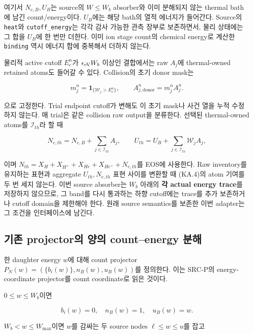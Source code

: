 \documentclass[11pt,a4paper]{article}
\begin{document}
여기서 \(N_{e,B},U_B\)는 source의 \(W\le W_b\) absorber와 이미 분해되지 않는 thermal bath에 남긴 count/energy이다. \(U_B\)에는 해당 bath의 열적 에너지가 들어간다. Source의 \texttt{heat}와 \texttt{cutoff\_energy}는 각각 감사 가능한 관측 장부로 보존하면서, 물리 상태에는 그 합을 \(U_B\)에 한 번만 더한다. 이미 ion stage count의 chemical energy로 계산한 \texttt{binding} 역시 에너지 합에 중복해서 더하지 않는다.

물리적 active cutoff \(E_c^n\)가 \(\epsilon_{\rm eV}W_b\) 이상인 결합에서는 raw \(A_j\)에 thermal-owned retained atoms도 들어갈 수 있다. Collision의 초기 donor mask는

\[
 m_j^n=\mathbf1_{\{\mathcal W_j>E_c^n\}},\qquad
 A_{j,\mathrm{donor}}^n=m_j^n A_j^n.
 \tag{KA.3}
\]

으로 고정한다. Trial endpoint cutoff가 변해도 이 초기 mask나 사건 열을 누적 수정하지 않는다. 매 trial은 같은 collision raw output을 분류한다. 선택된 thermal-owned atoms를 \(\mathcal I_{th}\)라 할 때

\[
 N_{e,th}=N_{e,B}+\sum_{j\in\mathcal I_{th}}A_j,\qquad
 U_{th}=U_B+\sum_{j\in\mathcal I_{th}}\mathcal W_jA_j,
 \tag{KA.4}
\]

이며 \(N_{th}=X_H+X_{H^+}+X_{He}+X_{He^+}+N_{e,th}\)를 EOS에 사용한다. Raw inventory를 유지하는 표현과 aggregate \(U_{th},N_{e,th}\) 표현 사이를 변환할 때 (KA.4)의 atom 기여를 두 번 세지 않는다. 이번 source absorber는 \(W_b\) 아래의 \textbf{각 actual energy trace}를 저장하지 않으므로, 그 band를 다시 통과하는 하향 cutoff에는 trace를 추가 보존하거나 cutoff domain을 제한해야 한다. 원래 source semantics를 보존한 이번 adapter는 그 조건을 인터페이스에 남긴다.

\hypertarget{uxae30uxc874-projectoruxc758-uxc591uxc758-countenergy-uxbd84uxd574}{%
\subsection{기존 projector의 양의 count--energy 분해}\label{uxae30uxc874-projectoruxc758-uxc591uxc758-countenergy-uxbd84uxd574}}

한 daughter energy \(w\)에 대해 count projector \(P_N(w)=(\{b_i(w)\},n_B(w),u_B(w))\)를 정의한다. 이는 SRC-P의 energy-coordinate projector를 count coordinate로 읽은 것이다.

\(0\le w\le W_b\)이면

\[
 b_i(w)=0,\quad n_B(w)=1,\quad u_B(w)=w.
 \tag{KA.5a}
\]

\(W_b<w\le W_{\max}\)이면 \(w\)를 감싸는 두 source nodes \(\ell\le w\le u\)를 잡고
\end{document}
